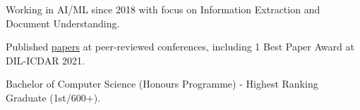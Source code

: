 % 
\begin{zitemize}
    \item Working in AI/ML since 2018 with focus on Information Extraction and Document Understanding.
    \item Published \href{https://scholar.google.com/citations?user=\gscholarid}{papers} at
    peer-reviewed conferences, including 1 Best Paper Award at DIL-ICDAR 2021.
    \item Bachelor of Computer Science (Honours Programme) - Highest Ranking Graduate (1st/600+).
\end{zitemize}
